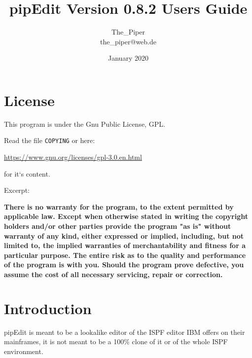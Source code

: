 \documentclass{report}
\begin{document}
\title{\huge \textbf{pipEdit} 
\break \break \small Version 0.8.2 \huge 
\break \break Users Guide \break \break \break}

\author{The\_Piper \\ the\_piper@web.de}
\date{January 2020}
\maketitle
\tableofcontents
\chapter{License}
This program is under the Gnu Public License, GPL.  \\ \break

Read the file \texttt{COPYING} or here:  \\ \break

\url{https://www.gnu.org/licenses/gpl-3.0.en.html}   \\ \break

for it‘s content. \\ \break

Excerpt: \\ \break

\textbf{    There is no warranty for the program, to the extent permitted by
	 applicable law.  Except when otherwise stated in writing the copyright
	 holders and/or other parties provide the program "as is" without warranty
	 of any kind, either expressed or implied, including, but not limited to,
	 the implied warranties of merchantability and fitness for a particular
	 purpose.  
	 \huge The entire risk as to the quality and performance of the program is with you. \normalsize
	 Should the program prove defective, you assume the cost of
	 all necessary servicing, repair or correction.
}

\chapter{Introduction}

pipEdit is meant to be a lookalike editor of the ISPF editor IBM offers on their mainframes, it is not meant to be a 100\% clone of it or of the whole ISPF environment. 
\end{document}
